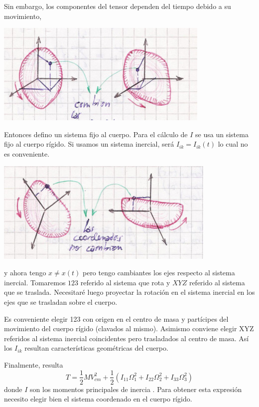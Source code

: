 \documentclass[10pt,oneside]{CBFT_book}
\begin{document}
Sin embargo, los componentes del tensor dependen del tiempo debido a su movimiento,

\includegraphics[scale=0.4]{images/fig_mc_rigid_body_ejesinercia1.jpg}

Entonces defino un sistema fijo al cuerpo. 
Para el cálculo de $I$ se usa un sistema fijo al cuerpo rígido. Si usamos un sistema inercial,
será $I_{ik}=I_{ik}(t)$ lo cual no es conveniente.

\includegraphics[scale=0.4]{images/fig_mc_rigid_body_ejesinercia2.jpg}

y ahora tengo $x\neq x(t)$ pero tengo cambiantes los ejes respecto al sistema inercial.
Tomaremos $123$ referido al sistema que rota y $XYZ$ referido al sistema que se traslada.
Necesitaré luego proyectar la rotación en el sistema inercial en los ejes que se trasladan
sobre el cuerpo.

Es conveniente elegir 123 con origen en el centro de masa y partícipes del movimiento del 
cuerpo rígido (clavados al mismo). Asimismo conviene elegir XYZ referidos al sistema inercial
coincidentes pero trasladados al centro de masa. Así los $I_{ik}$ resultan características
geométricas del cuerpo.

Finalmente, resulta 
\[
	T = \frac 1 2 M V_{cm}^2 + \frac 1 2 \left( I_{11} \Omega_1^2 + I_{22} \Omega_2^2 + I_{33} \Omega_3^2 \right)
\]
donde $I$ son los momentos principales de inercia . Para obtener
esta expresión necesito elegir bien el sistema coordenado en el cuerpo rígido.
\end{document}

